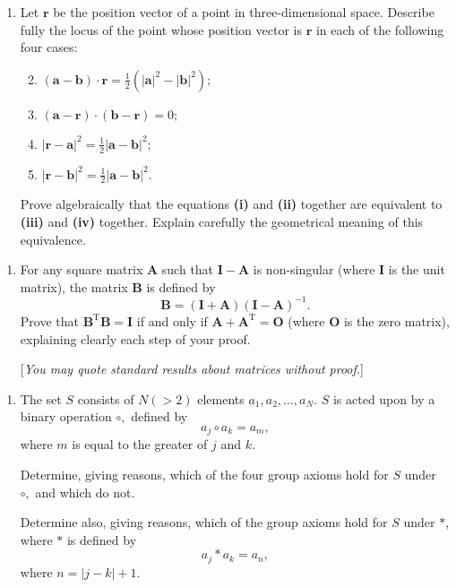 \documentclass[a4, 11pt]{report}
\newlength{\qspace}
\newcounter{qnumber}
\newenvironment{question}%
 {\vspace{\qspace}
  \begin{enumerate}[\bfseries 1\quad][10]%
    \setcounter{enumi}{\value{qnumber}}%
    \item%
 }
{
  \end{enumerate}
  \filbreak
  \stepcounter{qnumber}
 }
\newenvironment{questionparts}[1][1]%
 {
  \begin{enumerate}[\bfseries (i)]%
    \setcounter{enumii}{#1}
    \addtocounter{enumii}{-1}
    \setlength{\itemsep}{5mm}
    \setlength{\parskip}{8pt}
 }
 {
  \end{enumerate}
 }
\begin{document}
	\begin{question}
		Let $\mathbf{r}$ be the position vector of a point in three-dimensional
		space. Describe fully the locus of the point whose position vector
		is $\mathbf{r}$ in each of the following four cases: 

		\begin{questionparts}
		\item $\left(\mathbf{a-b}\right) \cdot \mathbf{r}=\frac{1}{2}(\left|\mathbf{a}\right|^{2}-\left|\mathbf{b}\right|^{2});$
		\item $\left(\mathbf{a-r}\right)\cdot\left(\mathbf{b-r}\right)=0;$
		\item $\left|\mathbf{r-a}\right|^{2}=\frac{1}{2}\left|\mathbf{a-b}\right|^{2};$ 
		\item $\left|\mathbf{r-b}\right|^{2}=\frac{1}{2}\left|\mathbf{a-b}\right|^{2}.$ 
		\end{questionparts}

		Prove algebraically that the equations \textbf{(i) }and \textbf{(ii)
		}together are equivalent to \textbf{(iii) }and \textbf{(iv) }together.
		Explain carefully the geometrical meaning of this equivalence.
		
		\end{question}
		
		
		\begin{question}
		For any square matrix $\mathbf{A}$ such that $\mathbf{I-A}$ is non-singular
		(where $\mathbf{I}$ is the unit matrix), the matrix $\mathbf{B}$
		is defined by 
		\[
		\mathbf{B}=(\mathbf{I+A})(\mathbf{I-A})^{-1}.
		\]
		Prove that $\mathbf{B}^{\mathrm{T}}\mathbf{B}=\mathbf{I}$ if and
		only if $\mathbf{A+A}^{\mathrm{T}}=\mathbf{O}$ (where $\mathbf{O}$
		is the zero matrix), explaining clearly each step of your proof.


		{[}\textit{You may quote standard results about matrices without proof.}{]}
		\end{question}
		
	
\begin{question}
	The set $S$ consists of $N(>2)$ elements $a_{1},a_{2},\ldots,a_{N}.$
	$S$ is acted upon by a binary operation $\circ,$ defined by 
	\[
	a_{j}\circ a_{k}=a_{m},
	\]
	where $m$ is equal to the greater of $j$ and $k$. 


	Determine, giving reasons, which of the four group axioms hold for
	$S$ under $\circ,$ and which do not. 


	Determine also, giving reasons, which of the group axioms hold for
	$S$ under $*$, where $*$ is defined by 
	\[
	a_{j}*a_{k}=a_{n},
	\]
	where $n=\left|j-k\right|+1$.
			\end{question}
			
\end{document}
